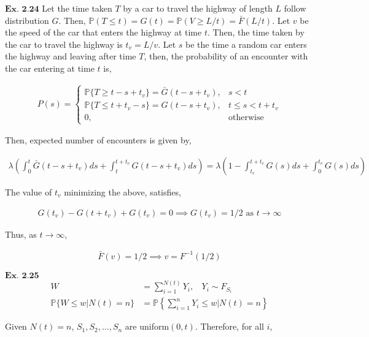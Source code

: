 \documentclass{article}
\begin{document}
\vspace{0.2in}
${\textbf{Ex. 2.24}}$
Let the time taken $T$ by a car to travel the highway of length $L$ follow distribution $G$. Then, $\mathbb{P}(T \leq t) = G(t) = \mathbb{P}(V \geq L/t) = \bar{F}(L/t)$. Let $v$ be the speed of the car that enters the highway at time $t$. Then, the time taken by the car to travel the highway is $t_v = L/v$. Let $s$ be the time a random car enters the highway and leaving after time $T$, then, the probability of an encounter with the car entering at time $t$ is,

\begin{align*}
P(s) = \left\{\begin{matrix}\mathbb{P}\{T \geq t-s+t_v\} = \bar{G}(t-s+t_v),&s<t\\\mathbb{P}\{T \leq t+t_v-s\}= G(t-s+t_v),&t \leq s < t+t_v\\0 ,& \text{otherwise}\end{matrix}\right.
\end{align*}

Then, expected number of encounters is given by,

\begin{align*}
\lambda\left(\int_{0}^{t}\bar{G}(t-s+t_v)ds + \int_{t}^{t+t_v}G(t-s+t_v)ds\right) = \lambda\left(1-\int_{t_v}^{t+t_v}G(s)ds + \int_{0}^{t_v}G(s)ds\right)
\end{align*}

The value of $t_v$ minimizing the above, satisfies,

\begin{align*}
G(t_v)-G(t+t_v) + G(t_v) = 0 \implies G(t_v) = 1/2 \text{ as } {t \rightarrow \infty}
\end{align*}

Thus, as $t \rightarrow \infty$,

\begin{align*}
\bar{F}(v) = 1/2 \implies v = F^{-1}(1/2)
\end{align*}

\vspace{0.2in}
${\textbf{Ex. 2.25}}$
\begin{align*}
W &= \sum_{i=1}^{N(t)}Y_i, \ \ \ \ Y_{i}\sim F_{S_{i}}\\
\mathbb{P}\{W \leq w|N(t)=n\} &= \mathbb{P}\left\{\sum_{i=1}^{n}Y_i \leq w\bigg\vert N(t)=n\right\}
\end{align*}

Given $N(t) = n$, $S_1,S_2,\ldots,S_n$ are uniform$(0,t)$. Therefore, for all $i$,
\end{document}
